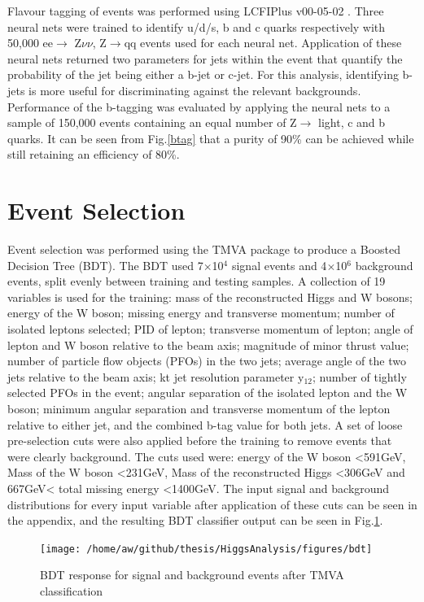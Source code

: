 Flavour tagging of events was performed using LCFIPlus v00-05-02 \cite{Suehara:2015ura}. Three neural nets were trained to identify u/d/s, b and c quarks respectively with 50,000 ee$\rightarrow$ Z$\nu\nu$, Z$\rightarrow$qq events used for each neural net. Application of these neural nets returned two parameters for jets within the event that quantify the probability of the jet being either a b-jet or c-jet. For this analysis, identifying b-jets is more useful for discriminating against the relevant backgrounds. Performance of the b-tagging was evaluated by applying the neural nets to a sample of 150,000 events containing an equal number of Z$\rightarrow$ light, c and b quarks. It can be seen from Fig.\ref{btag} that a purity of 90\% can be achieved while still retaining an efficiency of 80\%.

\section{Event Selection}

Event selection was performed using the TMVA package \cite{2007physics...3039H} to produce a Boosted Decision Tree (BDT). The BDT used 7$\times$10$^4$ signal events and 4$\times$10$^6$ background events, split evenly between training and testing samples. A collection of 19 variables is used for the training: mass of the reconstructed Higgs and W bosons; energy of the W boson; missing energy and transverse momentum; number of isolated leptons selected; PID of lepton; transverse momentum of lepton; angle of lepton and W boson relative to the beam axis; magnitude of minor thrust value; number of particle flow objects (PFOs) in the two jets; average angle of the two jets relative to the beam axis; kt jet resolution parameter y$_{12}$; number of tightly selected PFOs in the event; angular separation of the isolated lepton and the W boson;  minimum angular separation and transverse momentum of the lepton relative to either jet, and the combined b-tag value for both jets. A set of loose pre-selection cuts were also applied before the training to remove events that were clearly background. The cuts used were: energy of the W boson <591GeV, Mass of the W boson <231GeV, Mass of the reconstructed Higgs <306GeV and 667GeV< total missing energy <1400GeV. The input signal and background distributions for every input variable after application of these cuts can be seen in the appendix, and the resulting BDT classifier output can be seen in Fig.\ref{bdt}.  

\begin{figure}
  \centering
  \texttt{[image: /home/aw/github/thesis/HiggsAnalysis/figures/bdt]}
  \caption[Classifier BDT response]{BDT response for signal and background events after TMVA classification}
  \label{bdt}
\end{figure}

